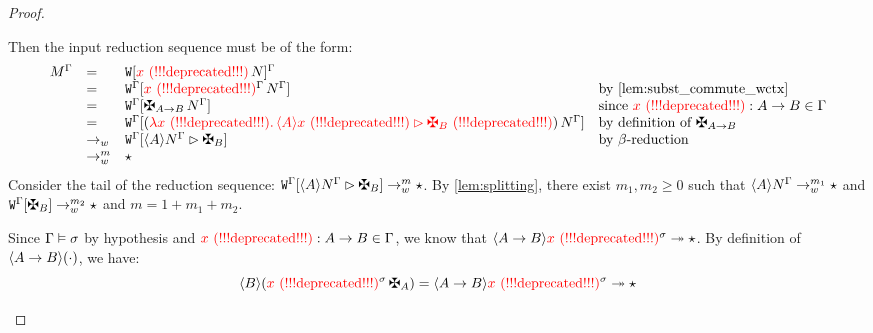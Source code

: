 \begin{proof}
\begin{enumerate}
\begin{enumerate}
    Then the input reduction sequence must be of the form:
    \[
      \begin{array}{rlll}
        \subs{\utm}{\tenv}
      & = &
        \subs{\ctxof{\wctx}{\var\,\utmtwo}}{\tenv}
      \\
      & = &
        \ctxof{\subs{\wctx}{\tenv}}{\subs{\var}{\tenv}\,\subs{\utmtwo}{\tenv}}
        & \text{by \cref{lem:subst_commute_wctx}}
      \\
      & = &
        \ctxof{\subs{\wctx}{\tenv}}{\gen{\typ\to\typtwo}\,\subs{\utmtwo}{\tenv}}
        & \text{since $\var:\typ\to\typtwo \in \tenv$}
      \\
      & = &
        \ctxof{\subs{\wctx}{\tenv}}{(\lam{\var}{\eunit{\verif{\typ}{\var}}{\gen{\typtwo}}})\,\subs{\utmtwo}{\tenv}}
        & \text{by definition of $\gen{\typ\to\typtwo}$}
      \\
      & \tow &
        \ctxof{\subs{\wctx}{\tenv}}{\eunit{\verif{\typ}{\subs{\utmtwo}{\tenv}}}{\gen{\typtwo}}}
        & \text{by $\symBeta$-reduction}
      \\
      & \tow^m &
        \iunit
      \end{array}
    \]
    Consider the tail of the reduction sequence:
    $\ctxof{\subs{\wctx}{\tenv}}{\eunit{\verif{\typ}{\subs{\utmtwo}{\tenv}}}{\gen{\typtwo}}}
     \tow^m \iunit$.
    By \cref{lem:splitting}, there exist $m_1,m_2 \geq 0$ such that
    $\langle A\rangle N^{\Gamma} \to_{w}^{m_1} \star$
    and
    $\ctxof{\subs{\wctx}{\tenv}}{\gen{\typtwo}} \tow^{m_2} \iunit$
    and $m = 1 + m_1 + m_2$.

    Since $\Gamma\vDash\sigma$ by hypothesis
    and $\textcolor{red}{x \text{\,\,(!!!deprecated!!!)}} : A\to B \in \Gamma$,
    we know that $\langle A\to B\rangle\textcolor{red}{x \text{\,\,(!!!deprecated!!!)}}^{\sigma} \twoheadrightarrow \star$.
    By definition of $\langle A\to B\rangle(\cdot)$, we have:
    \[
      \verif{\typtwo}{(\subs{\var}{\subst}\,\gen{\typ})}
      = \verif{\typ\to\typtwo}{\subs{\var}{\subst}}
      \tos \iunit
    \]


\end{enumerate}
\end{enumerate}
\end{proof}
